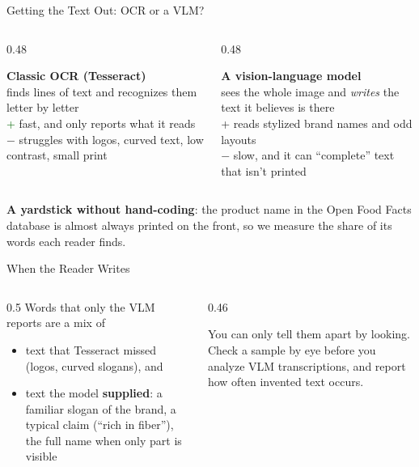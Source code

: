 \begin{frame}{Getting the Text Out: OCR or a VLM?}
\begin{columns}[T]
\begin{column}{0.48\textwidth}
\begin{graybox}[height=3.9cm]
\textbf{Classic OCR (Tesseract)}\\[2pt]
finds lines of text and recognizes them letter by letter\\[3pt]
\textcolor{darkgreen}{+} fast, and only reports what it reads\\
\textcolor{warnborder}{$-$} struggles with logos, curved text, low contrast, small print
\end{graybox}
\end{column}
\begin{column}{0.48\textwidth}
\begin{navybox}[height=3.9cm]
\textbf{A vision-language model}\\[2pt]
sees the whole image and \emph{writes} the text it believes is there\\[3pt]
+ reads stylized brand names and odd layouts\\
$-$ slow, and it can ``complete'' text that isn't printed
\end{navybox}
\end{column}
\end{columns}

\vspace{0.2cm}
\textbf{A yardstick without hand-coding}: the product name in the Open Food Facts database is almost
always printed on the front, so we measure the share of its words each reader finds.
\end{frame}

\begin{frame}{When the Reader Writes}
\begin{columns}[T]
\begin{column}{0.5\textwidth}
Words that only the VLM reports are a mix of
\begin{itemize}
\item text that Tesseract missed (logos, curved slogans), and
\item text the model \textbf{supplied}: a familiar slogan of the brand, a typical claim (``rich in
      fiber''), the full name when only part is visible
\end{itemize}
\end{column}
\begin{column}{0.46\textwidth}
\begin{warnbox}
You can only tell them apart by looking. Check a sample by eye before you analyze VLM
transcriptions, and report how often invented text occurs.
\end{warnbox}
\end{column}
\end{columns}
\end{frame}

